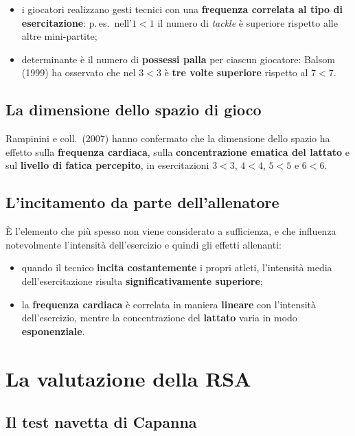 \begin{itemize}
  \item i giocatori realizzano gesti tecnici con una \textbf{frequenza correlata al tipo di
    esercitazione}: p.\,es.\ nell'$1 < 1$ il numero di \textit{tackle} è superiore rispetto alle
    altre mini-partite;
  \item determinante è il numero di \textbf{possessi palla} per ciascun giocatore: Balsom (1999) ha
    osservato che nel $3 < 3$ è \textbf{tre volte superiore} rispetto al $7 < 7$.
\end{itemize}

\subsection{La dimensione dello spazio di gioco}

Rampinini e coll.\ (2007) hanno confermato che la dimensione dello spazio ha effetto sulla
\textbf{frequenza cardiaca}, sulla \textbf{concentrazione ematica del lattato} e sul \textbf{livello
di fatica percepito}, in esercitazioni $3 < 3$, $4 < 4$, $5 < 5$ e $6 < 6$.

\subsection{L'incitamento da parte dell'allenatore}

È l'elemento che più spesso non viene considerato a sufficienza, e che influenza notevolmente
l'intensità dell'esercizio e quindi gli effetti allenanti:

\begin{itemize}
  \item quando il tecnico \textbf{incita costantemente} i propri atleti, l'intensità media
    dell'esercitazione risulta \textbf{significativamente superiore};
  \item la \textbf{frequenza cardiaca} è correlata in maniera \textbf{lineare} con l'intensità
    dell'esercizio, mentre la concentrazione del \textbf{lattato} varia in modo
    \textbf{esponenziale}.
\end{itemize}

\section{La valutazione della RSA}

\subsection{Il test navetta di Capanna}

